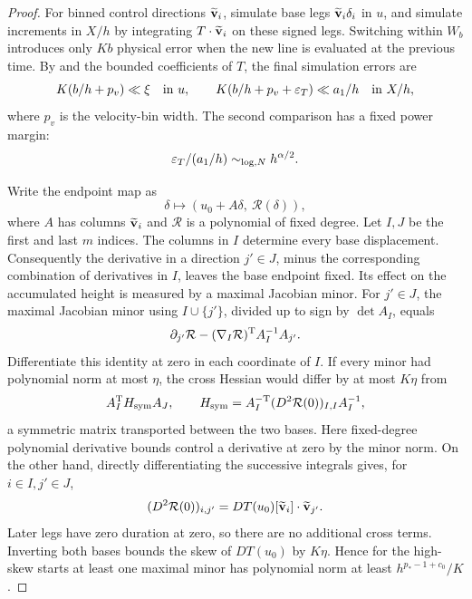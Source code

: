 \begin{proof}
For binned control directions \(\widetilde{\bf v}_i\), simulate
base legs \(\widetilde{\bf v}_i\delta_i\) in \(u\), and simulate
increments in \(X/h\) by integrating
\(T\cdot\widetilde{\bf v}_i\) on these signed legs.
Switching within \(W_b\) introduces only \(Kb\) physical error
when the new line is evaluated at the previous time.
By  and the bounded coefficients
of \(T\), the final simulation errors are
\[
 K(b/h+p_v)\ll\xi
 \quad\text{in }u,\qquad
 K(b/h+p_v+\varepsilon_T)\ll a_1/h
 \quad\text{in }X/h,
\]
where \(p_v\) is the velocity-bin width.
The second comparison has a fixed power margin:
\[
 \varepsilon_T/(a_1/h)\sim_{\log,N}h^{\alpha/2}.
\]

Write the endpoint map as
\[
 \delta\longmapsto
       (u_0+A\delta,\ \mathcal R(\delta)),
\]
where \(A\) has columns \(\widetilde{\bf v}_i\) and
\(\mathcal R\) is a polynomial of fixed degree.
Let \(I,J\) be the first and last \(m\) indices.
The columns in \(I\) determine every base displacement. Consequently
the derivative in a direction \(j'\in J\), minus the corresponding
combination of derivatives in \(I\), leaves the base endpoint fixed.
Its effect on the accumulated height is measured by a maximal
Jacobian minor. For \(j'\in J\), the maximal Jacobian minor using \(I\cup\{j'\}\),
divided up to sign by \(\det A_I\), equals
\[
 \partial_{j'}\mathcal R
 -(\nabla_I\mathcal R)^{\rm T}A_I^{-1}A_{j'}.
\]
Differentiate this identity at zero in each coordinate of \(I\).
If every minor had polynomial norm at most \(\eta\), the cross
Hessian would differ by at most \(K\eta\) from
\[
 A_I^{\rm T}H_{\rm sym}A_J,\qquad
 H_{\rm sym}
   =A_I^{-{\rm T}}(D^2\mathcal R(0))_{I,I}A_I^{-1},
\]
a symmetric matrix transported between the two bases.
Here fixed-degree polynomial derivative bounds control a
derivative at zero by the minor norm.
On the other hand, directly differentiating the successive
integrals gives, for \(i\in I,j'\in J\),
\[
 (D^2\mathcal R(0))_{i,j'}
       =DT(u_0)[\widetilde{\bf v}_i]\cdot
                    \widetilde{\bf v}_{j'}.
\]
Later legs have zero duration at zero, so there are no additional
cross terms. Inverting both bases bounds the skew of \(DT(u_0)\)
by \(K\eta\). Hence for the high-skew starts at least one maximal
minor has polynomial norm at least \(h^{p_*-1+c_0}/K\).


\end{proof}
